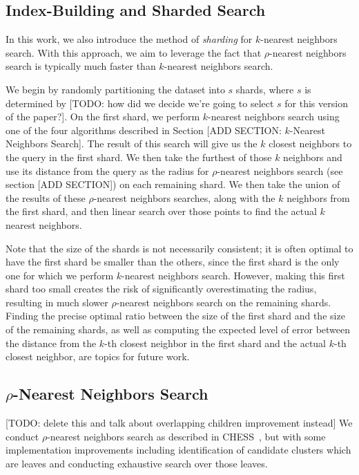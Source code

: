 \subsection {Index-Building and Sharded Search}
In this work, we also introduce the method of \emph{sharding} for $k$-nearest neighbors search.
With this approach, we aim to leverage the fact that $\rho$-nearest neighbors search is typically 
much faster than $k$-nearest neighbors search. 


We begin by randomly partitioning the dataset into $s$ shards, where $s$ is determined by [TODO: how did 
we decide we're going to select $s$ for this version of the paper?]. On the first shard, we perform 
$k$-nearest neighbors search using one of the four algorithms described in Section [ADD SECTION: $k$-Nearest Neighbors Search].
The result of this search will give us the $k$ closest neighbors to the query in the first shard. We then take the furthest of 
those $k$ neighbors and use its distance from the query as the radius for $\rho$-nearest neighbors search (see section [ADD SECTION]) 
on each remaining shard. We then take the union of the results of these $\rho$-nearest neighbors searches, along with the $k$ neighbors
from the first shard, and then linear search over those points to find the actual $k$ nearest neighbors.


Note that the size of the shards is not necessarily consistent; it is often optimal to have the first shard be smaller than the others,
since the first shard is the only one for which we perform $k$-nearest neighbors search. However, making this first shard too small
creates the risk of significantly overestimating the radius, resulting in much slower $\rho$-nearest neighbors search on the remaining shards.
Finding the precise optimal ratio between the size of the first shard and the size of the remaining shards, as well 
as computing the expected level of error between the distance from the $k$-th closest neighbor in the first shard and the 
actual $k$-th closest neighbor, are topics for future work.

\subsection{\texorpdfstring{$\rho$}{p}-Nearest Neighbors Search}
\label{subsec:methods:rnn-search}

[TODO: delete this and talk about overlapping children improvement instead]
We conduct $\rho$-nearest neighbors search as described in CHESS~\cite{ishaq2019clustered}, but 
with some implementation improvements including identification of candidate clusters which are leaves and 
conducting exhaustive search over those leaves.

